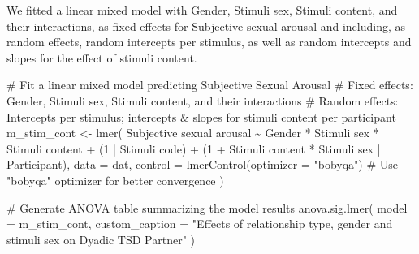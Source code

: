 \documentclass[
  bookmarksnumbered]{article}
\newenvironment{Shaded}{\begin{snugshade}}{\end{snugshade}}
\newcommand{\AttributeTok}[1]{\textcolor[rgb]{0.80,0.80,0.80}{#1}}
\newcommand{\CommentTok}[1]{\textcolor[rgb]{0.50,0.62,0.50}{#1}}
\newcommand{\DecValTok}[1]{\textcolor[rgb]{0.86,0.86,0.80}{#1}}
\newcommand{\FunctionTok}[1]{\textcolor[rgb]{0.94,0.94,0.56}{#1}}
\newcommand{\NormalTok}[1]{\textcolor[rgb]{0.80,0.80,0.80}{#1}}
\newcommand{\OtherTok}[1]{\textcolor[rgb]{0.94,0.94,0.56}{#1}}
\newcommand{\SpecialCharTok}[1]{\textcolor[rgb]{0.86,0.64,0.64}{#1}}
\newcommand{\StringTok}[1]{\textcolor[rgb]{0.80,0.58,0.58}{#1}}
\begin{document}
We fitted a linear mixed model with Gender, Stimuli sex, Stimuli content, and their interactions, as fixed effects for Subjective sexual arousal and including, as random effects, random intercepts per stimulus, as well as random intercepts and slopes for the effect of stimuli content.

\begin{Shaded}
\begin{Highlighting}[]
\CommentTok{\# Fit a linear mixed model predicting Subjective Sexual Arousal}
\CommentTok{\# Fixed effects: Gender, Stimuli sex, Stimuli content, and their interactions}
\CommentTok{\# Random effects: Intercepts per stimulus; intercepts \& slopes for stimuli content per participant}
\NormalTok{m\_stim\_cont }\OtherTok{\textless{}{-}} \FunctionTok{lmer}\NormalTok{(}
  \StringTok{\textasciigrave{}}\AttributeTok{Subjective sexual arousal}\StringTok{\textasciigrave{}} \SpecialCharTok{\textasciitilde{}}\NormalTok{ Gender }\SpecialCharTok{*} \StringTok{\textasciigrave{}}\AttributeTok{Stimuli sex}\StringTok{\textasciigrave{}} \SpecialCharTok{*} \StringTok{\textasciigrave{}}\AttributeTok{Stimuli content}\StringTok{\textasciigrave{}} \SpecialCharTok{+}
\NormalTok{    (}\DecValTok{1} \SpecialCharTok{|} \StringTok{\textasciigrave{}}\AttributeTok{Stimuli code}\StringTok{\textasciigrave{}}\NormalTok{) }\SpecialCharTok{+}
\NormalTok{    (}\DecValTok{1} \SpecialCharTok{+} \StringTok{\textasciigrave{}}\AttributeTok{Stimuli content}\StringTok{\textasciigrave{}} \SpecialCharTok{*} \StringTok{\textasciigrave{}}\AttributeTok{Stimuli sex}\StringTok{\textasciigrave{}} \SpecialCharTok{|}\NormalTok{ Participant),}
  \AttributeTok{data =}\NormalTok{ dat,}
  \AttributeTok{control =} \FunctionTok{lmerControl}\NormalTok{(}\AttributeTok{optimizer =} \StringTok{"bobyqa"}\NormalTok{) }\CommentTok{\# Use "bobyqa" optimizer for better convergence}
\NormalTok{)}

\CommentTok{\# Generate ANOVA table summarizing the model results}
\FunctionTok{anova.sig.lmer}\NormalTok{(}
  \AttributeTok{model =}\NormalTok{ m\_stim\_cont,}
  \AttributeTok{custom\_caption =} \StringTok{"Effects of relationship type, gender and stimuli sex on Dyadic TSD Partner"}
\NormalTok{)}
\end{Highlighting}
\end{Shaded}
\end{document}
